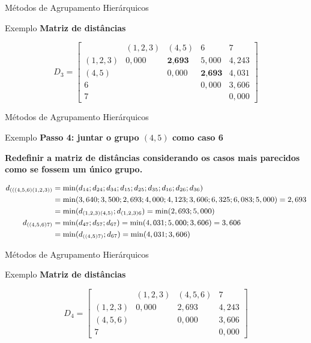 \documentclass[
  ignorenonframetext,
  aspectratio=169,
]{beamer}
\begin{document}
\begin{frame}{Métodos de Agrupamento Hierárquicos}
\label{muxe9todos-de-agrupamento-hieruxe1rquicos-24}
\begin{block}{Exemplo}
\label{exemplo-13}
\textbf{Matriz de distâncias}

\[D_3 = \left[ \begin{matrix}
&(1,2,3) &(4,5)&6&7\\ 
(1,2,3)& 0,000 & \textbf{2,693} & 5,000 & 4,243 \\
(4,5)    &  & 0,000 &  \textbf{2,693} & 4,031 \\
6  &     &  & 0,000 & 3,606 \\
7  &      &  &  & 0,000
                    \end{matrix} \right]\]
\end{block}
\end{frame}

\begin{frame}{Métodos de Agrupamento Hierárquicos}
\label{muxe9todos-de-agrupamento-hieruxe1rquicos-25}
\begin{block}{Exemplo}
\label{exemplo-14}
\textbf{Passo 4: juntar o grupo \((4,5)\) como caso 6}

\textbf{Redefinir a matriz de distâncias considerando os casos mais
parecidos como se fossem um único grupo.}

\[ \small
\begin{aligned}
d_{(((4,5,6)(1,2,3))} &=  \min(d_{14};d_{24};d_{34};d_{15};d_{25};d_{35};d_{16};d_{26};d_{36}) \\ 
&= \min(3,640; 3,500; 2,693; 4,000; 4,123; 3,606; 6,325; 6,083; 5,000) = 2,693 \\ &= 
\min(d_{(1,2,3)(4,5)};d_{(1,2,3)6}) = \min(2,693; 5,000) \\
d_{((4,5,6)7)} &= \min(d_{47};d_{57};d_{67}) =  \min(4,031; 5,000; 3,606) = 3,606 \\ &=  \min(d_{((4,5)7)};d_{67}) = \min(4,031;3,606) \\ 
\end{aligned}
\]
\end{block}
\end{frame}

\begin{frame}{Métodos de Agrupamento Hierárquicos}
\label{muxe9todos-de-agrupamento-hieruxe1rquicos-26}
\begin{block}{Exemplo}
\label{exemplo-15}
\textbf{Matriz de distâncias}

\[D_4 = \left[ \begin{matrix}
&(1,2,3) &(4,5,6) &7\\ 
(1,2,3)& 0,000 & 2,693 &  4,243 \\
(4,5,6)    &  & 0,000 &  3,606 \\
7  &       &  & 0,000
                    \end{matrix} \right]\]
\end{block}
\end{frame}
\end{document}
